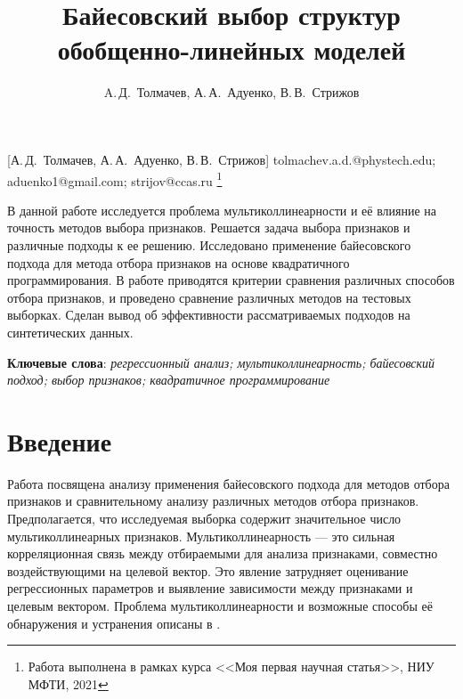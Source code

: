 \documentclass[12pt, twoside]{article}
\begin{document}
\title
    [Байесовский выбор структур обобщенно-линейных моделей] %
    {Байесовский выбор структур обобщенно-линейных моделей}
\author
    [A.\,Д.~Толмачев] %
    {A.\,Д.~Толмачев, А.\,А.~Адуенко, В.\,В.~Стрижов} %
    [А.\,Д.~Толмачев, А.\,А.~Адуенко, В.\,В.~Стрижов] %
\email
    {tolmachev.a.d.@phystech.edu; aduenko1@gmail.com; strijov@ccas.ru}
\thanks
    {Работа выполнена в рамках курса <<Моя первая научная статья>>, НИУ МФТИ, 2021}
    
\abstract
    {В данной работе исследуется проблема мультиколлинеарности и её влияние
    на точность методов выбора признаков. Решается задача выбора признаков и различные подходы к ее решению. Исследовано применение байесовского подхода для метода отбора признаков на основе квадратичного программирования. В работе приводятся критерии сравнения различных способов отбора признаков, и проведено сравнение различных методов на тестовых выборках.
    Сделан вывод об эффективности рассматриваемых подходов на синтетических данных.

\bigskip
\noindent
\textbf{Ключевые слова}: \emph {регрессионный анализ; мультиколлинеарность; байесовский подход; выбор признаков;  квадратичное программирование}
}


\maketitle
\linenumbers

\section{Введение}
Работа посвящена анализу применения байесовского подхода для методов отбора признаков и сравнительному анализу различных методов отбора признаков. Предполагается, что исследуемая выборка содержит значительное число мультиколлинеарных признаков. Мультиколлинеарность — это сильная корреляционная связь между отбираемыми для анализа признаками, совместно
воздействующими на целевой вектор. Это явление затрудняет оценивание регрессионных параметров и выявление зависимости между признаками и целевым вектором. Проблема мультиколлинеарности и возможные способы её обнаружения и устранения описаны в \cite{SneeRon, Leamer, Askin}. 
\end{document}
